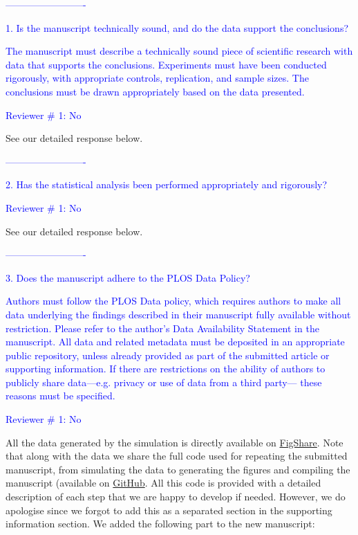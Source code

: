 \documentclass[11pt]{letter}
\begin{document}
\begin{letter}{}
\textcolor{blue}{-------------------------}

\textcolor{blue}{1. Is the manuscript technically sound, and do the data support the conclusions?}

\textcolor{blue}{The manuscript must describe a technically sound piece of scientific research with data that supports the conclusions. Experiments must have been conducted rigorously, with appropriate controls, replication, and sample sizes. The conclusions must be drawn appropriately based on the data presented.}

\textcolor{blue}{Reviewer $\#$ 1: No}

See our detailed response below.

\textcolor{blue}{-------------------------}

\textcolor{blue}{2. Has the statistical analysis been performed appropriately and rigorously?}

\textcolor{blue}{Reviewer $\#$ 1: No}

See our detailed response below.

\textcolor{blue}{-------------------------}

\textcolor{blue}{3. Does the manuscript adhere to the PLOS Data Policy?}

\textcolor{blue}{Authors must follow the PLOS Data policy, which requires authors to make all data underlying the findings described in their manuscript fully available without restriction. Please refer to the author’s Data Availability Statement in the manuscript. All data and related metadata must be deposited in an appropriate public repository, unless already provided as part of the submitted article or supporting information. If there are restrictions on the ability of authors to publicly share data—e.g. privacy or use of data from a third party— these reasons must be specified.}

\textcolor{blue}{Reviewer $\#$ 1: No}

All the data generated by the simulation is directly available on \href{http://figshare.com/articles/Effect_of_missing_data_on_topological_inference_using_a_total_evidence_approach/1306861}{FigShare}. Note that along with the data we share the full code used for repeating the submitted manuscript, from simulating the data to generating the figures and compiling the manuscript (available on \href{https://github.com/TGuillerme/Total_Evidence_Method-Missing_data}{GitHub}. All this code is provided with a detailed description of each step that we are happy to develop if needed. However, we do apologise since we forgot to add this as a separated section in the supporting information section. We added the following part to the new manuscript:


\end{letter}
\end{document}
